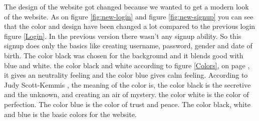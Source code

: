 The design of the website got changed because we wanted to get a modern look of the website. As on figure \ref{fig:new-login} and figure \ref{fig:new-signup} you can see that the color and design have been changed a lot compared to the previous login figure \ref{Login}. In the previous version there wasn’t any signup ability. So this signup does only the basics like creating username, password, gender and date of birth. The color black was chosen for the background and it blends good with blue and white. the color black and white according to figure \ref{Colors}, on page \pageref{Colors}, it gives an neutrality feeling and the color blue gives calm feeling. According to Judy Scott-Kemmis \cite{EmpowerColor}, the meaning of the color is,  the color black is the secretive and the unknown, and creating an air of mystery. the color white is the color of perfection. The color blue is the color of trust and peace. The color black, white and blue is the basic colors for the website.


